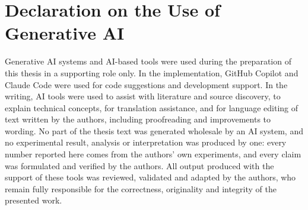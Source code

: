\section{Declaration on the Use of Generative AI}
\label{sec:declaration_use_of_ai}

Generative AI systems and AI-based tools were used during the preparation of this thesis
in a supporting role only. In the implementation, GitHub Copilot and Claude Code were
used for code suggestions and development support. In the writing, AI tools were used to
assist with literature and source discovery, to explain technical concepts, for
translation assistance, and for language editing of text written by the authors,
including proofreading and improvements to wording. No part of the thesis text was
generated wholesale by an AI system, and no experimental result, analysis or
interpretation was produced by one: every number reported here comes from the authors'
own experiments, and every claim was formulated and verified by the authors. All output
produced with the support of these tools was reviewed, validated and adapted by the
authors, who remain fully responsible for the correctness, originality and integrity of
the presented work.
